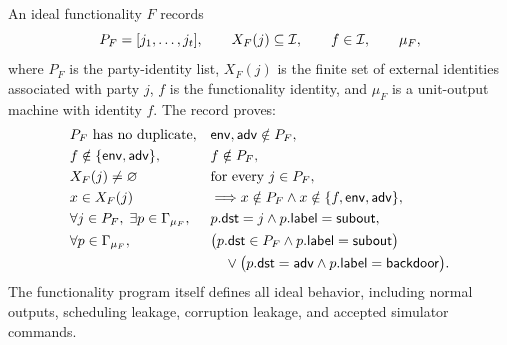 \begin{definition}
\label{def:uc-ideal-functionality}
\leanok
An ideal functionality \(F\) records
\[
  P_F=[j_1,\ldots,j_t],
  \qquad X_F(j)\subseteq\mathcal{I},
  \qquad f\in\mathcal{I},
  \qquad \mu_F,
\]
where \(P_F\) is the party-identity list, \(X_F(j)\) is the finite set of
external identities associated with party \(j\), \(f\) is the functionality
identity, and \(\mu_F\) is a unit-output machine with identity \(f\).  The
record proves:
\[
\begin{aligned}
  &P_F\text{ has no duplicate},
  &&\mathsf{env},\mathsf{adv}\notin P_F,\\
  &f\notin\{\mathsf{env},\mathsf{adv}\},
  &&f\notin P_F,\\
  &X_F(j)\ne\varnothing
    &&\text{for every }j\in P_F,\\
  &x\in X_F(j)
    &&\Longrightarrow
      x\notin P_F\land x\notin\{f,\mathsf{env},\mathsf{adv}\},\\
  &\forall j\in P_F,\;\exists p\in\Gamma_{\mu_F},
    &&p.\mathsf{dst}=j\land p.\mathsf{label}=\mathsf{subout},\\
  &\forall p\in\Gamma_{\mu_F},
    &&\bigl(p.\mathsf{dst}\in P_F
      \land p.\mathsf{label}=\mathsf{subout}\bigr)\\
  &&&\quad\lor
      \bigl(p.\mathsf{dst}=\mathsf{adv}
      \land p.\mathsf{label}=\mathsf{backdoor}\bigr).
\end{aligned}
\]
The functionality program itself defines all ideal behavior, including normal
outputs, scheduling leakage, corruption leakage, and accepted simulator
commands.
\end{definition}

